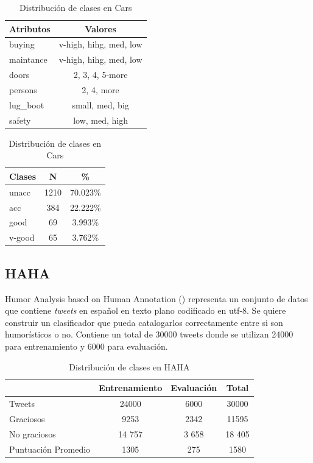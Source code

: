 \begin{table}[ht]
    \centering
    \parbox{.45\linewidth}{
    \begin{tabular} { |l|c| }
        \hline
        Atributos & Valores \\
        \hline
        \hline
        buying & v-high, hihg, med, low \\
        \hline
        maintance &  v-high, hihg, med, low\\
        \hline
        doors & 2, 3, 4, 5-more\\
        \hline
        persons & 2, 4, more\\
        \hline
        lug\_boot & small, med, big\\
        \hline
        safety & low, med, high\\
        \hline
    \end{tabular}
    \caption{Tipos de Atributos en Cars}
    \label{implementation:table:cars:attributes}
    }
    \qquad
    \parbox[t]{.45\linewidth}{
    \begin{tabular} {|l|c|c|}
        \hline
        Clases & N & \% \\
        \hline
        \hline
        unacc & 1210 & 70.023\%\\
        \hline
        acc & 384 & 22.222\%\\
        \hline
        good & 69 & 3.993\%\\
        \hline
        v-good & 65 & 3.762\%\\
        \hline
    \end{tabular}
    \caption{Distribuci\'on de clases en Cars}
    \label{implementation:table:cars:classes}
    }
\end{table}

\subsection{HAHA}
Humor Analysis based on Human Annotation (\cite{chiruzzo2019overview}) representa un conjunto de datos que contiene \textit{tweets} en espa\~nol en texto plano codificado en utf-8. Se quiere construir un clasificador que pueda catalogarlos correctamente entre si son humor\'isticos o no. Contiene un total de 30000 tweets donde se utilizan 24000 para entrenamiento y 6000 para evaluaci\'on.

\begin{table}[ht]
    \centering
    \begin{tabular} {|l||c|c|c|}
        \hline
        & Entrenamiento & Evaluaci\'on & Total \\
        \hline
        \hline
        Tweets & 24000 & 6000 & $30000$\\
        \hline
        Graciosos & 9253 & 2342 & 11595\\
        \hline
        No graciosos & 14 757 & 3 658 & 18 405\\
        \hline
        Puntuaci\'on Promedio & 1305 & 275 & 1580\\
        \hline
    \end{tabular}
    \caption{Distribuci\'on de clases en HAHA}
    \label{implementation:table:haha}
\end{table}

